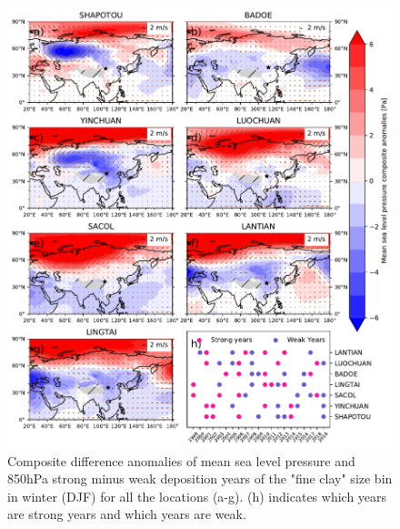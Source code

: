 \begin{figure}[hp]
    \centering
    \includegraphics[width=\columnwidth]{texfiles/figs/mslp_850hPa_2micron_DJF.pdf}
    \caption{Composite difference anomalies of mean sea level pressure and 850hPa strong minus weak deposition years of the "fine clay" size bin in winter (DJF) for all the locations (a-g). (h) indicates which years are strong years and which years are weak.}
    \label{fig:DJF_850_fine_composite}
\end{figure}


